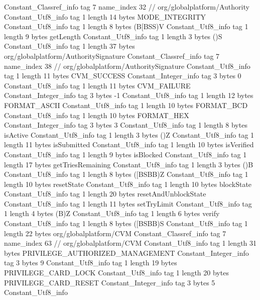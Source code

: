 {{{		}
		Constant_Classref_info {
			tag	7
			name_index	32		// org/globalplatform/Authority
		}
		Constant_Utf8_info {
			tag	1
			length	14
			bytes	MODE_INTEGRITY
		}
		Constant_Utf8_info {
			tag	1
			length	8
			bytes	(B[BSS)V
		}
		Constant_Utf8_info {
			tag	1
			length	9
			bytes	getLength
		}
		Constant_Utf8_info {
			tag	1
			length	3
			bytes	()S
		}
		Constant_Utf8_info {
			tag	1
			length	37
			bytes	org/globalplatform/AuthoritySignature
		}
		Constant_Classref_info {
			tag	7
			name_index	38		// org/globalplatform/AuthoritySignature
		}
		Constant_Utf8_info {
			tag	1
			length	11
			bytes	CVM_SUCCESS
		}
		Constant_Integer_info {
			tag	3
			bytes	0
		}
		Constant_Utf8_info {
			tag	1
			length	11
			bytes	CVM_FAILURE
		}
		Constant_Integer_info {
			tag	3
			bytes	-1
		}
		Constant_Utf8_info {
			tag	1
			length	12
			bytes	FORMAT_ASCII
		}
		Constant_Utf8_info {
			tag	1
			length	10
			bytes	FORMAT_BCD
		}
		Constant_Utf8_info {
			tag	1
			length	10
			bytes	FORMAT_HEX
		}
		Constant_Integer_info {
			tag	3
			bytes	3
		}
		Constant_Utf8_info {
			tag	1
			length	8
			bytes	isActive
		}
		Constant_Utf8_info {
			tag	1
			length	3
			bytes	()Z
		}
		Constant_Utf8_info {
			tag	1
			length	11
			bytes	isSubmitted
		}
		Constant_Utf8_info {
			tag	1
			length	10
			bytes	isVerified
		}
		Constant_Utf8_info {
			tag	1
			length	9
			bytes	isBlocked
		}
		Constant_Utf8_info {
			tag	1
			length	17
			bytes	getTriesRemaining
		}
		Constant_Utf8_info {
			tag	1
			length	3
			bytes	()B
		}
		Constant_Utf8_info {
			tag	1
			length	8
			bytes	([BSBB)Z
		}
		Constant_Utf8_info {
			tag	1
			length	10
			bytes	resetState
		}
		Constant_Utf8_info {
			tag	1
			length	10
			bytes	blockState
		}
		Constant_Utf8_info {
			tag	1
			length	20
			bytes	resetAndUnblockState
		}
		Constant_Utf8_info {
			tag	1
			length	11
			bytes	setTryLimit
		}
		Constant_Utf8_info {
			tag	1
			length	4
			bytes	(B)Z
		}
		Constant_Utf8_info {
			tag	1
			length	6
			bytes	verify
		}
		Constant_Utf8_info {
			tag	1
			length	8
			bytes	([BSBB)S
		}
		Constant_Utf8_info {
			tag	1
			length	22
			bytes	org/globalplatform/CVM
		}
		Constant_Classref_info {
			tag	7
			name_index	63		// org/globalplatform/CVM
		}
		Constant_Utf8_info {
			tag	1
			length	31
			bytes	PRIVILEGE_AUTHORIZED_MANAGEMENT
		}
		Constant_Integer_info {
			tag	3
			bytes	9
		}
		Constant_Utf8_info {
			tag	1
			length	19
			bytes	PRIVILEGE_CARD_LOCK
		}
		Constant_Utf8_info {
			tag	1
			length	20
			bytes	PRIVILEGE_CARD_RESET
		}
		Constant_Integer_info {
			tag	3
			bytes	5
		}
		Constant_Utf8_info {
}}}
